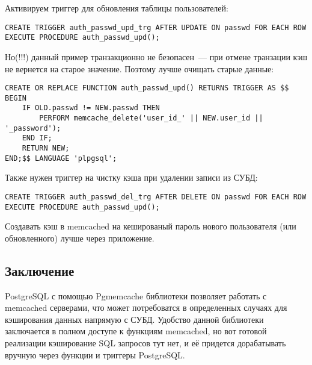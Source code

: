 Активируем триггер для обновления таблицы пользователей:
\begin{lstlisting}[label=lst:pgcache11,caption=Триггер]
CREATE TRIGGER auth_passwd_upd_trg AFTER UPDATE ON passwd FOR EACH ROW EXECUTE PROCEDURE auth_passwd_upd();
\end{lstlisting}

Но(!!!) данный пример транзакционно не безопасен~--- при отмене транзации кэш не вернется на старое значение. 
Поэтому лучше очищать старые данные:
\begin{lstlisting}[label=lst:pgcache12,caption=Очистка ключа в кэше]
CREATE OR REPLACE FUNCTION auth_passwd_upd() RETURNS TRIGGER AS $$
BEGIN
	IF OLD.passwd != NEW.passwd THEN
		PERFORM memcache_delete('user_id_' || NEW.user_id || '_password');
	END IF;
	RETURN NEW;
END;$$ LANGUAGE 'plpgsql';
\end{lstlisting}
 
Также нужен триггер на чистку кэша при удалении записи из СУБД:
\begin{lstlisting}[label=lst:pgcache11,caption=Триггер]
CREATE TRIGGER auth_passwd_del_trg AFTER DELETE ON passwd FOR EACH ROW EXECUTE PROCEDURE auth_passwd_upd();
\end{lstlisting}

Создавать кэш в memcached на кешированый пароль нового пользователя (или обновленного) лучше через приложение.

\subsection{Заключение}
PostgreSQL с помощью Pgmemcache библиотеки позволяет работать с memcached серверами, 
что может потребоватся в определенных случаях для кэширования данных напрямую с СУБД. 
Удобство данной библиотеки заключается в полном доступе к функциям memcached, 
но вот готовой реализации кэширование SQL запросов тут нет, 
и её придется дорабатывать вручную через функции и триггеры PostgreSQL.